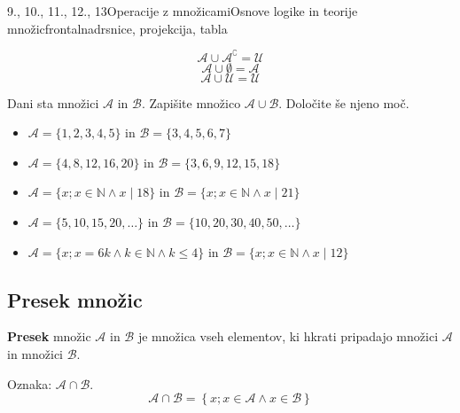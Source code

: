 \begin{priprava}{9., 10., 11., 12., 13}{}{Operacije z množicami}{Osnove logike in teorije množic}{frontalna}{drsnice, projekcija, tabla}
\begin{figure}[H]
\begin{subfigure}[b]{0.4\textwidth}
\begin{tikzpicture}
            \end{tikzpicture}
        \end{subfigure}
    \end{figure}


                $$ \mathcal{A}\cup\mathcal{A}^\complement=\mathcal{U}$$
                $$ \mathcal{A}\cup\emptyset=\mathcal{A}$$
                $$ \mathcal{A}\cup\mathcal{U}=\mathcal{U}$$
            


                \begin{naloga}
                    Dani sta množici $\mathcal{A}$ in $\mathcal{B}$. Zapišite množico $\mathcal{A}\cup\mathcal{B}$.
                    Določite še njeno moč.
                    \begin{itemize}
                        \item $\mathcal{A}=\{1,2,3,4,5\}$ in $\mathcal{B}=\{3,4,5,6,7\}$
                        \item $\mathcal{A}=\{4,8,12,16,20\}$ in $\mathcal{B}=\{3,6,9,12,15,18\}$
                        \item $\mathcal{A}=\{x; x\in\mathbb{N} \land x\mid 18\}$ in $\mathcal{B}=\{x; x\in\mathbb{N} \land x\mid 21\}$
                        \item $\mathcal{A}=\{5,10,15,20,\dots\}$ in $\mathcal{B}=\{10, 20, 30, 40, 50, \dots\}$
                        \item $\mathcal{A}=\{x; x=6k \land k\in\mathbb{N} \land k\leq 4\}$ in $\mathcal{B}=\{x; x\in\mathbb{N} \land x\mid 12\}$
                    \end{itemize}
                \end{naloga}
        




\subsection{Presek množic}
            \textbf{Presek} množic $\mathcal{A}$ in $\mathcal{B}$ je množica vseh elementov, ki hkrati 
            pripadajo množici $\mathcal{A}$ in množici $\mathcal{B}$.

            Oznaka: $\mathbf{\mathcal{A}\cap\mathcal{B}}$.
            $$ \mathcal{A}\cap\mathcal{B}=\left\{x; x\in\mathcal{A}\land x\in\mathcal{B}\right\} $$
        

            \begin{figure}[H]
                \centering
                \begin{subfigure}[b]{0.4\textwidth}
                    \centering
\end{subfigure}
\end{figure}
\end{priprava}
